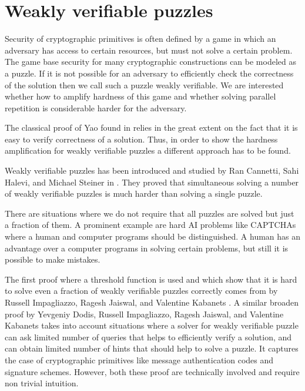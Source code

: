 \documentclass[11pt,a4paper,titlepage]{memoir}
\begin{document}
\section{Weakly verifiable puzzles}
Security of cryptographic primitives is often defined by
a game in which an adversary has access to certain resources, but must not solve a certain problem.
The game base security for many cryptographic constructions can be modeled as a puzzle.
If it is not possible for an adversary to efficiently check the correctness of the solution then
we call such a puzzle weakly verifiable. We are interested whether how to amplify hardness of this game
and whether solving parallel repetition is considerable harder for the adversary.

The classical proof of Yao found in \cite{Goldreich:2000:FCB:519078} relies in the great extent on the fact that
it is easy to verify correctness of a solution.
Thus, in order to show the hardness amplification for weakly verifiable puzzles a different approach has to be found.

Weakly verifiable puzzles has been introduced and studied by Ran Cannetti, Sahi Halevi, and Michael Steiner in \cite{canetti2004hardness}.
They proved that simultaneous solving a number of weakly verifiable puzzles is much harder than solving a single puzzle.

There are situations where we do not require that all puzzles are solved but just a fraction of them.
A prominent example are hard AI problems like CAPTCHAs where a human and computer programs should be distinguished.
A human has an advantage over a computer programs in solving certain problems, but still it is possible to make mistakes.

The first proof where a threshold function is used and which show that it is hard to solve even a fraction of weakly
verifiable puzzles correctly comes from by Russell Impagliazzo, Ragesh Jaiswal, and Valentine Kabanets \cite{impagliazzo2007chernoff}.
A similar broaden proof by Yevgeniy Dodis, Russell Impagliazzo, Ragesh Jaiswal, and Valentine Kabanets \cite{Dodis:2009:SAI:1530441.1530450}
takes into account situations where a solver for weakly verifiable puzzle can ask limited number of queries
that helps to efficiently verify a solution, and can obtain limited number of hints that should help to solve a puzzle.
It captures the case of cryptographic primitives like message authentication codes and signature schemes.
However, both these proof are technically involved and require non trivial intuition.
\end{document}
